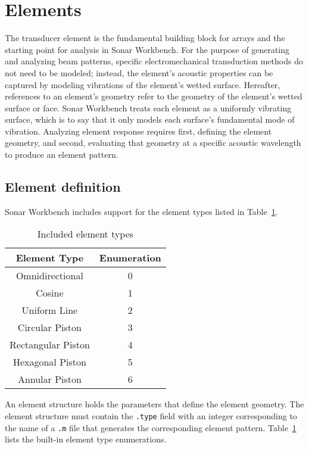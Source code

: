 \section{Elements}\label{sec:element}

The transducer element is the fundamental building block for arrays and the starting point for analysis in Sonar Workbench. For the purpose of generating and analyzing beam patterns, specific electromechanical transduction methods do not need to be modeled; instead, the element's acoustic properties can be captured by modeling vibrations of the element's wetted surface. Hereafter, references to an element's geometry refer to the geometry of the element's wetted surface or face. Sonar Workbench treats each element as a uniformly vibrating surface, which is to say that it only models each surface's fundamental mode of vibration. Analyzing element response requires first, defining the element geometry, and second, evaluating that geometry at a specific acoustic wavelength to produce an element pattern.

\subsection{Element definition}

Sonar Workbench includes support for the element types listed in Table~\ref{tab:ElementTypes}. 

\begin{table}[!ht]
	\begin{center}
		\caption{Included element types}
		\label{tab:ElementTypes}
		\begin{tabular}{c|c} 
			\textbf{Element Type} & \textbf{Enumeration} \\
			\hline
			Omnidirectional  & 0 \\
			Cosine & 1 \\
			Uniform Line & 2 \\
			Circular Piston & 3 \\
			Rectangular Piston & 4 \\
			Hexagonal Piston & 5 \\
			Annular Piston & 6 \\
		\end{tabular}
	\end{center}
\end{table}

An element structure holds the parameters that define the element geometry. The element structure must contain the \texttt{.type} field with an integer corresponding to the name of a \texttt{.m} file that generates the corresponding element pattern. Table~\ref{tab:ElementTypes} lists the built-in element type enumerations.

